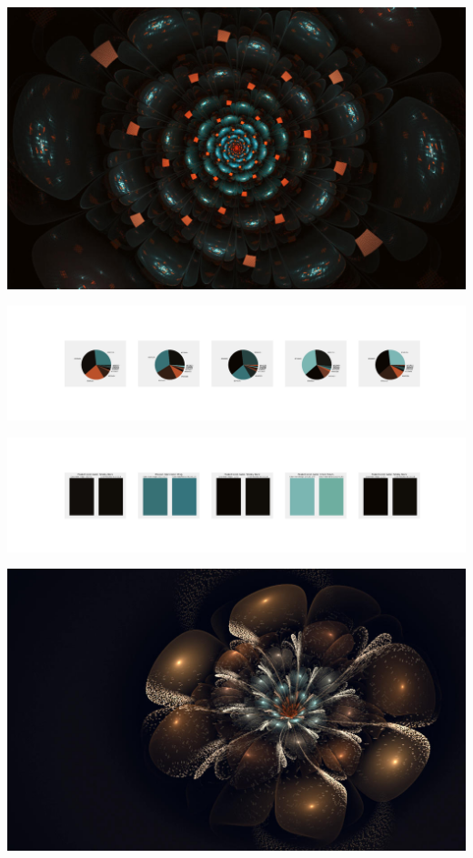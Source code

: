 \documentclass[11pt]{article}
\begin{document}
\begin{landscape}
    \begin{center}
    \includegraphics[width=\textwidth]{./nbimg/file (72).jpg}
    \end{center}

    \begin{center}
    \includegraphics[width=250mm]{./nbimg/pie-421.jpg}
    \end{center}

    \begin{center}
    \includegraphics[width=250mm]{./nbimg/peak-421.jpg}
    \end{center}
    

    \begin{center}
    \includegraphics[width=\textwidth]{./nbimg/file (73).jpg}
    \end{center}


\end{landscape}
\end{document}
